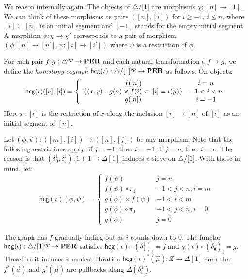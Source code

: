 \documentclass{amsart}
\theoremstyle{plain}
\theoremstyle{definition}
\newcommand\set[1]{\left\{#1\right\}}
\newcommand\ri{^*}
\begin{document}

We reason internally again. The objects of ${\mathord{\triangle}}/[1]$ are morphisms $\chi:[n]\to [1]$. We can think of these morphisms as pairs $([n],[i])$ for $i\geq -1$, $i\leq n$, where $[i]\subseteq [n]$ is an initial segment and $[-1]$ stands for the empty initial segment. A morphism $\phi:\chi\to\chi'$ corresponds to a pair of morphism $(\phi:[n]\to[n'],\psi:[i]\to [i'])$ where $\psi$ is a restriction of $\phi$. 

\newcommand\hcg{\mathsf{hcg}}
For each pair $f,g:{\mathord{\triangle}}^{op}\to\mathbf{PER}$ and each natural transformation $\iota:f\to g$, we define the \emph{homotopy cograph} $\hcg(\iota):\simcat/[1]\dual \to \pers$ as follows. On objects:
\[ \hcg(\iota)([n],[i]) = \left\{\begin{array}{cc}
f([n]) & i=n \\
\set{(x,y)\of g(n)\times f(i)| x\cdot [i] = \iota(y)} & -1< i < n \\
g([n]) & i=-1
\end{array}\right.\]
Here $x\cdot [i]$ is the restriction of $x$ along the inclusion $[i]\to [n]$ of $[i]$ as an initial segment of $[n]$.

Let $(\phi,\psi):([m],[i]) \to ([n],[j])$ be any morphism. Note that the following restrictions apply: if $j=-1$, then $i=-1$; if $j=n$, then $i=n$. The reason is that $(\delta^1_0,\delta^1_1):1+1\to \Delta[1]$ induces a sieve on ${\mathord{\triangle}}/[1]$. With those in mind, let:
\[ \hcg(\iota)(\phi,\psi) = \left\{\begin{array}{cc}
f(\psi) & j=n\\
f(\psi)\circ \pi_1 & -1 < j < n, i=m\\
g(\phi) \times f(\psi) & -1<i<m\\
g(\phi)\circ\pi_0 & -1< j < n, i=0\\
g(\phi) & j=0
\end{array}\right.\]

The graph has $f$ gradually fading out as $i$ counts down to $0$. The functor $\hcg(\iota):\simcat/[1]\dual\to\pers$ satisfies $\hcg(\iota)\circ(\delta^1_1)_! = f$ and $\chi(\iota)\circ(\delta^1_0)_! = g$. Therefore it induces a modest fibration $\hcg(\iota)\ri(\vec \mu): Z\to \Delta[1]$ such that $f\ri(\vec \mu)$ and $g\ri(\vec \mu)$ are pullbacks along $\Delta(\delta_i^1)$.
\end{document}
